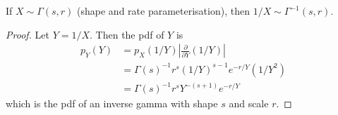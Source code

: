 \begin{lemma}
  If $X\sim\Gamma(s,r)$ (shape and rate parameterisation), then $1/X \sim \Gamma^{-1}(s,r)$.
\end{lemma}

\begin{proof}
  Let $Y=1/X$.
  Then the pdf of $Y$ is
  \begingroup
  \setlength{\abovedisplayskip}{8pt}
  \setlength{\belowdisplayskip}{5pt}  
  \begin{align*}
    p_Y(Y) 
    &= p_X(1/Y) \left\vert \frac{\partial}{\partial Y} (1/Y) \right\vert \\
    &= \Gamma(s)^{-1} r^s (1/Y)^{s-1} e^{-r/Y} (1/Y^2) \\
    &= \Gamma(s)^{-1} r^s Y^{-(s+1)} e^{-r/Y}
  \end{align*}
  \endgroup  
  which is the pdf of an inverse gamma with shape $s$ and scale $r$.
\end{proof}
